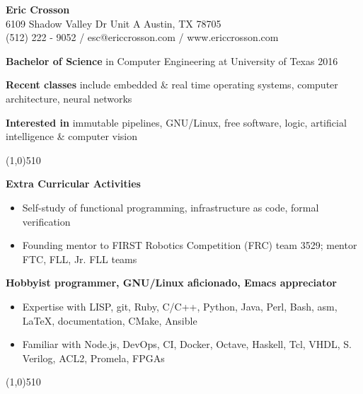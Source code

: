 \documentclass{report}
\newcommand{\cut}{\begin{center} \line(1,0){510} \end{center}}
\begin{document}
\pagestyle{empty}
\setlength\parindent{0pt}

\begin{center}
  \textbf{Eric Crosson} \\
  6109 Shadow Valley Dr Unit A Austin, TX 78705 \\
  (512) 222 - 9052 / esc@ericcrosson.com / www.ericcrosson.com
\end{center}

\textbf{Bachelor of Science} in Computer Engineering at University of Texas
2016

\vspace{1mm}

\textbf{Recent classes} include embedded \& real time operating systems,
computer architecture, neural networks

\vspace{1mm}

\textbf{Interested in} immutable pipelines, GNU/Linux, free software,
logic, artificial intelligence \& computer vision

\cut{}

\textbf{Extra Curricular Activities}
\begin{itemize}[label=$\circ$]
\item Self-study of functional programming, infrastructure as code, formal
  verification
\item Founding mentor to FIRST Robotics Competition (FRC) team 3529; mentor FTC,
  FLL, Jr. FLL teams
\end{itemize}

\textbf{Hobbyist programmer, GNU/Linux aficionado, Emacs appreciator}
\begin{itemize}[label=$\circ$]
\item Expertise with LISP, git, Ruby, C/C++, Python, Java, Perl, Bash, asm,
  \LaTeX{}, documentation, CMake, Ansible
\item Familiar with Node.js, DevOps, CI, Docker, Octave, Haskell, Tcl, VHDL, S.
  Verilog, ACL2, Promela, FPGAs
\end{itemize}

\cut{}
\end{document}
